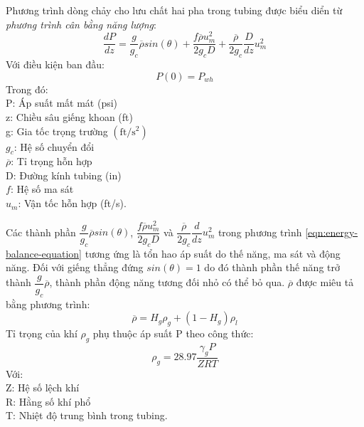 \documentclass[12pt,a4paper]{report}
\begin{document}
Phương trình dòng chảy cho lưu chất hai pha trong tubing được biểu diển từ \textit{phương trình cân bằng năng lượng}:
	\begin{equation}\label{eqn:energy-balance-equation}
		\dfrac{dP}{dz} = \dfrac{g}{g_c}\overline{\rho}sin(\theta) + \dfrac{f\overline{\rho}u_m^2}{2g_cD} + \dfrac{\overline{\rho}}{2g_c}\dfrac{D}{dz}u_m^2
	\end{equation}
Với điều kiện ban đầu:
	\begin{equation}\label{eqn:initial-cons}
		P(0) = P_{wh}
	\end{equation}
Trong đó:\\
\hspace*{1cm}P: Áp suất mất mát (psi)\\
\hspace*{1cm}z: Chiều sâu giếng khoan (ft)\\
\hspace*{1cm}g: Gia tốc trọng trường $(\text{ft}/\text{s}^2)$\\
\hspace*{1cm}$g_c$: Hệ số chuyển đổi\\
\hspace*{1cm}$\overline{\rho}$: Tỉ trọng hỗn hợp\\
\hspace*{1cm}D: Đường kính tubing (in)\\
\hspace*{1cm}$f$: Hệ số ma sát\\
\hspace*{1cm}$u_m$: Vận tốc hỗn hợp (ft/s).

Các thành phần $\dfrac{g}{g_c}\overline{\rho}sin(\theta)$, $\dfrac{f\overline{\rho}u_m^2}{2g_cD}$ và $\dfrac{\overline{\rho}}{2g_c}\dfrac{d}{dz}u_m^2$ trong phương trình \ref{eqn:energy-balance-equation} tương ứng là tổn hao áp suất do thế năng, ma sát và động năng. Đối với giếng thẳng đứng $sin(\theta) = 1$ do đó thành phần thế năng trở thành $\dfrac{g}{g_c}\overline{\rho}$, thành phần động năng tương đối nhỏ có thể bỏ qua. $\overline{\rho}$ được miêu tả bằng phương trình:
	\begin{equation}\label{eqn:mixture-density}
		\overline{\rho} = H_g\rho_g + (1 - H_g)\rho_l
	\end{equation}
Tỉ trọng của khí $\rho_g$ phụ thuộc áp suất P theo công thức:
	\begin{equation}\label{eqn:gas-density}
		\rho_g = 28.97\dfrac{\gamma_gP}{ZRT}
	\end{equation}
Với:\\
\hspace*{1cm}Z: Hệ số lệch khí\\
\hspace*{1cm}R: Hằng số khí phổ\\
\hspace*{1cm}T: Nhiệt độ trung bình trong tubing.
\end{document}
